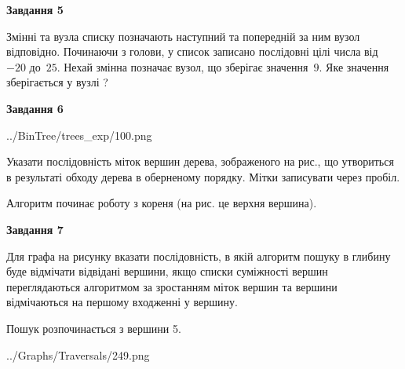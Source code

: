 \documentclass[12pt, ukrainian]{article}
\begin{document}
{\begin {large}
{\begin {center}\textbf{Завдання 5}\end {center}}\par
Змінні  та  вузла списку позначають наступний та попередній за ним вузол відповідно. Починаючи з голови, у список записано послідовні цілі числа від~$-20$ до~$25$. Нехай змінна  позначає вузол, що зберігає значення~$9$.
Яке значення зберігається у вузлі  ?\par
\newpage

{\begin {center}\textbf{Завдання 6}\end {center}}\par

\begin{center}
	{../BinTree/trees_exp/100.png}
\end{center}
Указати послідовність міток вершин дерева, зображеного на рис., що утвориться в результаті обходу дерева в оберненому порядку. Мітки записувати через пробіл.\par Алгоритм починає роботу з кореня (на рис. це верхня вершина).\par
\newpage

{\begin {center}\textbf{Завдання 7}\end {center}}\par
Для графа на рисунку вказати послідовність, в якій алгоритм пошуку в глибину буде відмічати відвідані вершини, якщо списки суміжності вершин переглядаються алгоритмом за зростанням міток вершин та вершини відмічаються на першому вход\-женні у вершину.\par
Пошук розпочинається з вершини 5.\par

\begin{center}
	{../Graphs/Traversals/249.png}
\end{center}\par
\newpage


\end{large}}
\end{document}
